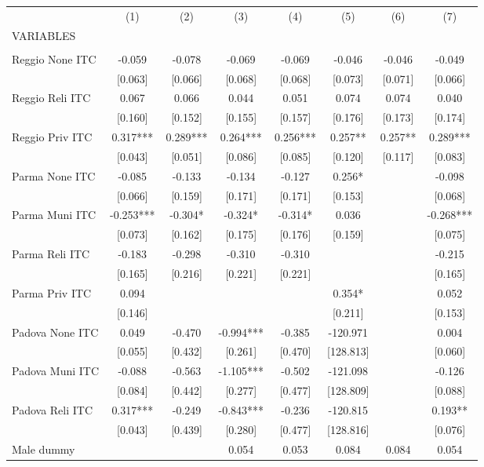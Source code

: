 \begin{tabular}{lccccccc} \hline
 & (1) & (2) & (3) & (4) & (5) & (6) & (7) \\
VARIABLES &  &  &  &  &  &  &  \\ \hline
 &  &  &  &  &  &  &  \\
Reggio None ITC & -0.059 & -0.078 & -0.069 & -0.069 & -0.046 & -0.046 & -0.049 \\
 & [0.063] & [0.066] & [0.068] & [0.068] & [0.073] & [0.071] & [0.066] \\
Reggio Reli ITC & 0.067 & 0.066 & 0.044 & 0.051 & 0.074 & 0.074 & 0.040 \\
 & [0.160] & [0.152] & [0.155] & [0.157] & [0.176] & [0.173] & [0.174] \\
Reggio Priv ITC & 0.317*** & 0.289*** & 0.264*** & 0.256*** & 0.257** & 0.257** & 0.289*** \\
 & [0.043] & [0.051] & [0.086] & [0.085] & [0.120] & [0.117] & [0.083] \\
Parma None ITC & -0.085 & -0.133 & -0.134 & -0.127 & 0.256* &  & -0.098 \\
 & [0.066] & [0.159] & [0.171] & [0.171] & [0.153] &  & [0.068] \\
Parma Muni ITC & -0.253*** & -0.304* & -0.324* & -0.314* & 0.036 &  & -0.268*** \\
 & [0.073] & [0.162] & [0.175] & [0.176] & [0.159] &  & [0.075] \\
Parma Reli ITC & -0.183 & -0.298 & -0.310 & -0.310 &  &  & -0.215 \\
 & [0.165] & [0.216] & [0.221] & [0.221] &  &  & [0.165] \\
Parma Priv ITC & 0.094 &  &  &  & 0.354* &  & 0.052 \\
 & [0.146] &  &  &  & [0.211] &  & [0.153] \\
Padova None ITC & 0.049 & -0.470 & -0.994*** & -0.385 & -120.971 &  & 0.004 \\
 & [0.055] & [0.432] & [0.261] & [0.470] & [128.813] &  & [0.060] \\
Padova Muni ITC & -0.088 & -0.563 & -1.105*** & -0.502 & -121.098 &  & -0.126 \\
 & [0.084] & [0.442] & [0.277] & [0.477] & [128.809] &  & [0.088] \\
Padova Reli ITC & 0.317*** & -0.249 & -0.843*** & -0.236 & -120.815 &  & 0.193** \\
 & [0.043] & [0.439] & [0.280] & [0.477] & [128.816] &  & [0.076] \\
Male dummy &  &  & 0.054 & 0.053 & 0.084 & 0.084 & 0.054 \\

\end{tabular}
